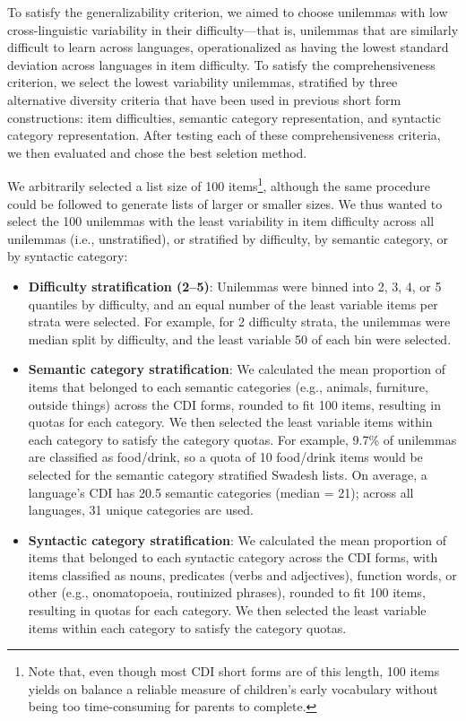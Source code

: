 \documentclass[
  letterpaper,
  DIV=11,
  numbers=noendperiod]{scrartcl}
\providecommand{\tightlist}{%
  \setlength{\itemsep}{0pt}\setlength{\parskip}{0pt}}\usepackage{longtable,booktabs,array}
\begin{document}
To satisfy the generalizability criterion, we aimed to choose unilemmas
with low cross-linguistic variability in their difficulty---that is,
unilemmas that are similarly difficult to learn across languages,
operationalized as having the lowest standard deviation across languages
in item difficulty. To satisfy the comprehensiveness criterion, we
select the lowest variability unilemmas, stratified by three alternative
diversity criteria that have been used in previous short form
constructions: item difficulties, semantic category representation, and
syntactic category representation. After testing each of these
comprehensiveness criteria, we then evaluated and chose the best
seletion method.

We arbitrarily selected a list size of 100 items\footnote{Note that,
  even though most CDI short forms are of this length, 100 items yields
  on balance a reliable measure of children's early vocabulary without
  being too time-consuming for parents to complete.}, although the same
procedure could be followed to generate lists of larger or smaller
sizes. We thus wanted to select the 100 unilemmas with the least
variability in item difficulty across all unilemmas (i.e.,
unstratified), or stratified by difficulty, by semantic category, or by
syntactic category:

\begin{itemize}
\tightlist
\item
  \textbf{Difficulty stratification (2--5)}: Unilemmas were binned into
  2, 3, 4, or 5 quantiles by difficulty, and an equal number of the
  least variable items per strata were selected. For example, for 2
  difficulty strata, the unilemmas were median split by difficulty, and
  the least variable 50 of each bin were selected.
\item
  \textbf{Semantic category stratification}: We calculated the mean
  proportion of items that belonged to each semantic categories (e.g.,
  animals, furniture, outside things) across the CDI forms, rounded to
  fit 100 items, resulting in quotas for each category. We then selected
  the least variable items within each category to satisfy the category
  quotas. For example, 9.7\% of unilemmas are classified as food/drink,
  so a quota of 10 food/drink items would be selected for the semantic
  category stratified Swadesh lists. On average, a language's CDI has
  20.5 semantic categories (median = 21); across all languages, 31
  unique categories are used.
\item
  \textbf{Syntactic category stratification}: We calculated the mean
  proportion of items that belonged to each syntactic category across
  the CDI forms, with items classified as nouns, predicates (verbs and
  adjectives), function words, or other (e.g., onomatopoeia, routinized
  phrases), rounded to fit 100 items, resulting in quotas for each
  category. We then selected the least variable items within each
  category to satisfy the category quotas.
\end{itemize}
\end{document}
